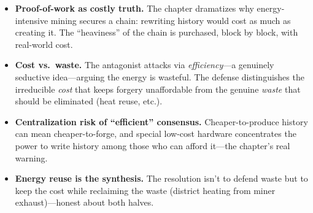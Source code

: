 \begin{itemize}
\tightlist
\item
  \textbf{Proof-of-work as costly truth.} The chapter dramatizes why
  energy-intensive mining secures a chain: rewriting history would cost as much as
  creating it. The ``heaviness'' of the chain is purchased, block by block, with
  real-world cost.
\item
  \textbf{Cost vs.\ waste.} The antagonist attacks via \emph{efficiency}---a
  genuinely seductive idea---arguing the energy is wasteful. The defense
  distinguishes the irreducible \emph{cost} that keeps forgery unaffordable from
  the genuine \emph{waste} that should be eliminated (heat reuse, etc.).
\item
  \textbf{Centralization risk of ``efficient'' consensus.} Cheaper-to-produce
  history can mean cheaper-to-forge, and special low-cost hardware concentrates
  the power to write history among those who can afford it---the chapter's real
  warning.
\item
  \textbf{Energy reuse is the synthesis.} The resolution isn't to defend waste but
  to keep the cost while reclaiming the waste (district heating from miner
  exhaust)---honest about both halves.
\end{itemize}
